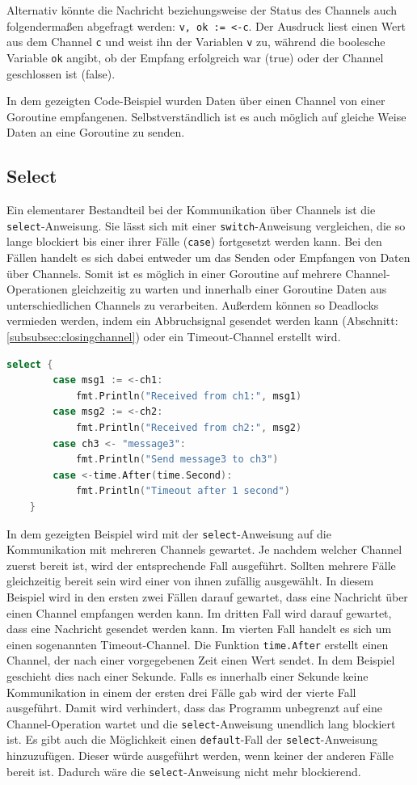 \documentclass[fontsize=12pt,paper=a4,twoside=semi,parskip=half-,headsepline,headinclude]{scrreprt}
\begin{document}
Alternativ könnte die Nachricht beziehungsweise der Status des Channels auch folgendermaßen abgefragt werden: \texttt{v, ok := <-c}. Der Ausdruck liest einen Wert aus dem Channel \texttt{c} und weist ihn der Variablen \texttt{v} zu, während die boolesche Variable \texttt{ok} angibt, ob der Empfang erfolgreich war (true) oder der Channel geschlossen ist (false).

In dem gezeigten Code-Beispiel wurden Daten über einen Channel von einer Goroutine empfangenen. Selbstverständlich ist es auch möglich auf gleiche Weise Daten an eine Goroutine zu senden.

\subsection{Select}

Ein elementarer Bestandteil bei der Kommunikation über Channels ist die \texttt{select}-Anweisung\cite{GoSpecification2024}. Sie lässt sich mit einer \texttt{switch}-Anweisung vergleichen, die so lange blockiert bis einer ihrer Fälle (\texttt{case}) fortgesetzt werden kann. Bei den Fällen handelt es sich dabei entweder um das Senden oder Empfangen von Daten über Channels. Somit ist es möglich in einer Goroutine auf mehrere Channel-Operationen gleichzeitig zu warten und innerhalb einer Goroutine Daten aus unterschiedlichen Channels zu verarbeiten. Außerdem können so Deadlocks vermieden werden, indem ein Abbruchsignal gesendet werden kann (Abschnitt: \ref{subsubsec:closingchannel}) oder ein Timeout-Channel erstellt wird.

\begin{lstlisting}[language=Go,extendedchars=true]
	select {
		case msg1 := <-ch1:
			fmt.Println("Received from ch1:", msg1)
		case msg2 := <-ch2:
			fmt.Println("Received from ch2:", msg2)
		case ch3 <- "message3":
			fmt.Println("Send message3 to ch3")
		case <-time.After(time.Second):
			fmt.Println("Timeout after 1 second")
	}
\end{lstlisting}

In dem gezeigten Beispiel wird mit der \texttt{select}-Anweisung auf die Kommunikation mit mehreren Channels gewartet. Je nachdem welcher Channel zuerst bereit ist, wird der entsprechende Fall ausgeführt. Sollten mehrere Fälle gleichzeitig bereit sein wird einer von ihnen zufällig ausgewählt. In diesem Beispiel wird in den ersten zwei Fällen darauf gewartet, dass eine Nachricht über einen Channel empfangen werden kann. Im dritten Fall wird darauf gewartet, dass eine Nachricht gesendet werden kann. Im vierten Fall handelt es sich um einen sogenannten Timeout-Channel. Die Funktion \texttt{time.After} erstellt einen Channel, der nach einer vorgegebenen Zeit einen Wert sendet. In dem Beispiel geschieht dies nach einer Sekunde. Falls es innerhalb einer Sekunde keine Kommunikation in einem der ersten drei Fälle gab wird der vierte Fall ausgeführt. Damit wird verhindert, dass das Programm unbegrenzt auf eine Channel-Operation wartet und die \texttt{select}-Anweisung unendlich lang blockiert ist. Es gibt auch die Möglichkeit einen \texttt{default}-Fall der \texttt{select}-Anweisung hinzuzufügen. Dieser würde ausgeführt werden, wenn keiner der anderen Fälle bereit ist. Dadurch wäre die \texttt{select}-Anweisung nicht mehr blockierend.
\end{document}
